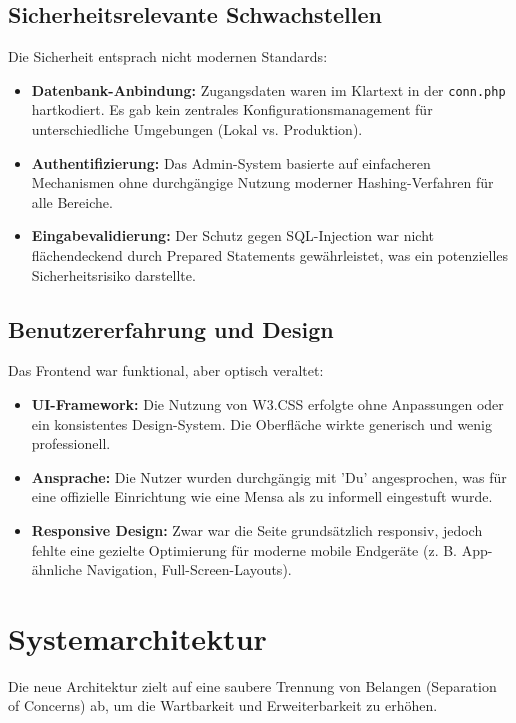 \documentclass[11pt,
a4paper,
numbers=nonperiod,
footsepline,
oneside,
numbers=noenddot,
bibliography=totoc
]{scrreprt}
\begin{document}
\section{Sicherheitsrelevante Schwachstellen}
Die Sicherheit entsprach nicht modernen Standards:
\begin{itemize}
    \item \textbf{Datenbank-Anbindung:} Zugangsdaten waren im Klartext in der \texttt{conn.php} hartkodiert. Es gab kein zentrales Konfigurationsmanagement für unterschiedliche Umgebungen (Lokal vs. Produktion).
    \item \textbf{Authentifizierung:} Das Admin-System basierte auf einfacheren Mechanismen ohne durchgängige Nutzung moderner Hashing-Verfahren für alle Bereiche.
    \item \textbf{Eingabevalidierung:} Der Schutz gegen SQL-Injection war nicht flächendeckend durch Prepared Statements gewährleistet, was ein potenzielles Sicherheitsrisiko darstellte.
\end{itemize}

\section{Benutzererfahrung und Design}
Das Frontend war funktional, aber optisch veraltet:
\begin{itemize}
    \item \textbf{UI-Framework:} Die Nutzung von W3.CSS erfolgte ohne Anpassungen oder ein konsistentes Design-System. Die Oberfläche wirkte generisch und wenig professionell.
    \item \textbf{Ansprache:} Die Nutzer wurden durchgängig mit 'Du' angesprochen, was für eine offizielle Einrichtung wie eine Mensa als zu informell eingestuft wurde.
    \item \textbf{Responsive Design:} Zwar war die Seite grundsätzlich responsiv, jedoch fehlte eine gezielte Optimierung für moderne mobile Endgeräte (z. B. App-ähnliche Navigation, Full-Screen-Layouts).
\end{itemize}

\chapter{Systemarchitektur}
Die neue Architektur zielt auf eine saubere Trennung von Belangen (Separation of Concerns) ab, um die Wartbarkeit und Erweiterbarkeit zu erhöhen.
\end{document}

